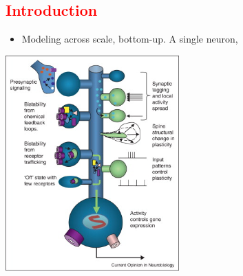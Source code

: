 \documentclass[a0paper,12pt]{article}
\newenvironment{Figure}
  {\par\medskip\noindent\minipage{\linewidth}}
  {\endminipage\par\medskip}
\begin{document}
\vspace{5cm}
\setlength{\columnsep}{6cm}
\begin{multicols}{3}
    \section*{\HUGE \textcolor{red}{Introduction}}
\HUGE

\begin{Figure}
\begin{itemize}
    \item Modeling across scale, bottom-up. A single neuron, 
\end{itemize}

    \includegraphics[width=0.5\textwidth]{./images/computation_inside_neurons.jpg}
\end{Figure}

\end{multicols}
\end{document}
